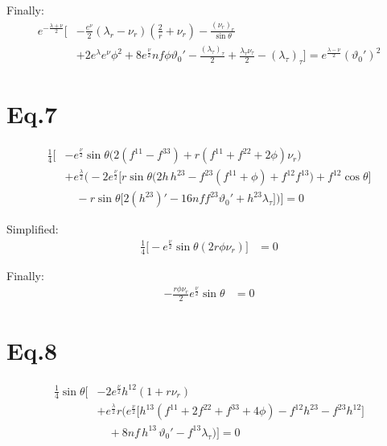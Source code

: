 \documentclass[12pt]{article}
\begin{document}
Finally:
\begin{align*}
e^{-\frac{\lambda + \nu}{2}} \Big[
 &- \frac{e^{\nu}}{2} \left( \lambda_r - \nu_r \right) \left(\frac{2}{r} + \nu_r\right)
 - \frac{(\nu_r)_r}{\sin\theta} \\
 &+ 2 e^{\lambda} e^{\nu} \phi^2
 + 8 e^{\frac{\nu}{2}} nf\phi\vartheta_0'
 - \frac{(\lambda_\tau)_\tau}{2} + \frac{\lambda_\tau \nu_\tau}{2} -(\lambda_\tau)_\tau
\Big] = e^\frac{\lambda - \nu}{2} (\vartheta_0')^2
\end{align*}

\section*{Eq.7}

\begin{align*}
\frac{1}{4} \Big[
 & - e^{\frac{\nu}{2}} \sin\theta
   \Big(
     2(f^{11} - f^{33})
     + r(f^{11} + f^{22} + 2\phi)\nu_r
   \Big) \\
 & + e^{\frac{\lambda}{2}}
   \Big(
     -2 e^{\frac{\nu}{2}} \big[
       r \sin\theta \big(
         2h\,h^{23}
         - f^{23}(f^{11} + \phi)
         + f^{12}f^{13}
       \big)
       + f^{12}\cos\theta
     \big] \\
 & \quad - r \sin\theta
       \big[
         2(h^{23})'
         - 16nf f^{23}\vartheta_0'
         + h^{23}\lambda_\tau
       \big]
   \Big)
\Big] = 0
\end{align*}

Simplified:
\begin{align*}
\frac{1}{4} \Big[- e^{\frac{\nu}{2}} \sin\theta (2r\phi\nu_r) \Big] &= 0
\end{align*}

Finally:
\begin{align*}
- \frac{r \phi \nu_r}{2} e^{\frac{\nu}{2}} \sin\theta &= 0
\end{align*}

\section*{Eq.8}

\begin{align*}
\frac{1}{4} \sin\theta \Big[
 & -2 e^{\frac{\nu}{2}}
   h^{12}\left(1 + r\nu_r\right) \\
 & + e^{\frac{\lambda}{2}} r
   \Big(
     e^{\frac{\nu}{2}} \big[
       h^{13}(f^{11} + 2f^{22} + f^{33} + 4\phi)
       - f^{12}h^{23}
       - f^{23}h^{12}
     \big] \\
     & \quad + 8nf\,h^{13}\,\vartheta_0'
     - f^{13}\lambda_\tau
   \Big)
\Big] = 0
\end{align*}
\end{document}
